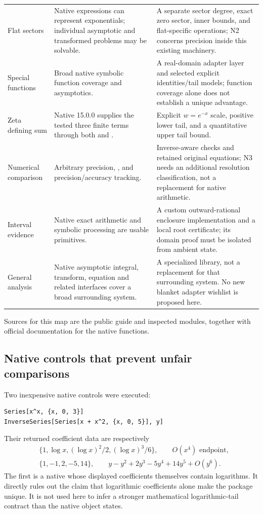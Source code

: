 \documentclass[11pt,letterpaper]{article}
\newcommand{\code}[1]{\texttt{\detokenize{#1}}}
\begin{document}
\begin{longtable}{@{}P{1.10in}P{2.31in}P{2.63in}@{}}
Flat sectors & Native expressions can represent exponentials; individual
asymptotic and transformed problems may be solvable. & A separate sector degree,
exact zero sector, inner bounds, and flat-specific operations; N2 concerns
precision inside this existing machinery.\\
Special functions & Broad native symbolic function coverage and asymptotics. &
A real-domain adapter layer and selected explicit identities/tail models;
function coverage alone does not establish a unique advantage.\\
Zeta defining sum & Native 15.0.0 supplies the tested three finite terms through
both \code{Asymptotic} and \code{Normal[Series[...]]}. & Explicit $w=e^{-x}$ scale,
positive lower tail, and a quantitative upper tail bound.\\
Numerical comparison & Arbitrary precision, \code{FindRoot}, and precision/accuracy
tracking. & Inverse-aware checks and retained original equations; N3 needs an
additional resolution classification, not a replacement for native arithmetic.\\
Interval evidence & Native exact arithmetic and symbolic processing are usable
primitives. & A custom outward-rational enclosure implementation and a local
root certificate; its domain proof must be isolated from ambient state.\\
General analysis & Native asymptotic integral, transform, equation and related
interfaces cover a broad surrounding system. & A specialized library, not a
replacement for that surrounding system. No new blanket adapter wishlist is
proposed here.\\
\bottomrule
\end{longtable}
\noindent Sources for this map are the public guide and inspected modules,
together with official documentation for the native functions.
\cite{readme,seriesops,coordinates,reciprocal,gammaops,fourier,flat,flatops,special,
identities,dirichlet,numerical,certificates,wlseries,wlinverse,wlsolve,wlasymptotic}

\subsection{Native controls that prevent unfair comparisons}
Two inexpensive native controls were executed:
\begin{lstlisting}
Series[x^x, {x, 0, 3}]
InverseSeries[Series[x + x^2, {x, 0, 5}], y]
\end{lstlisting}
Their returned coefficient data are respectively
\begin{align*}
 &\{1,\log x,(\log x)^2/2,(\log x)^3/6\},\qquad O(x^4)\text{ endpoint},\\
 &\{1,-1,2,-5,14\},\qquad y-y^2+2y^3-5y^4+14y^5+O(y^6).
\end{align*}
The first is a native \code{SeriesData} whose displayed coefficients themselves
contain logarithms. It directly rules out the claim that logarithmic
coefficients alone make the package unique. It is not used here to infer a
stronger mathematical logarithmic-tail contract than the native object states.
\end{document}
